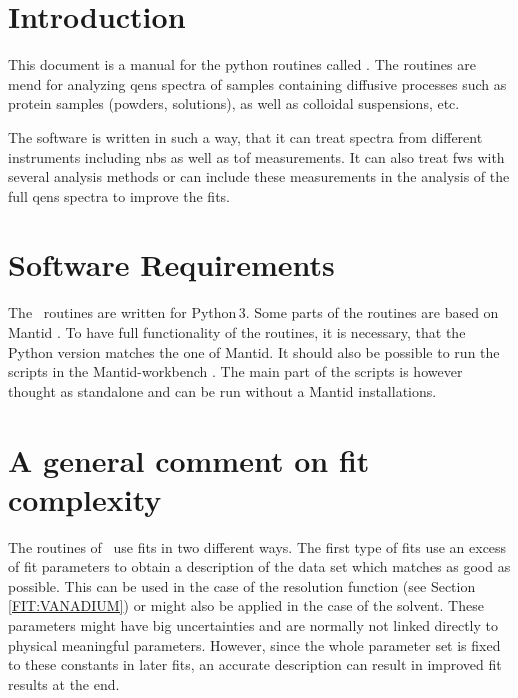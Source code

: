 \section{Introduction}
This document is a manual for the python routines called \PyQENS. The routines are mend for analyzing \gls{qens} spectra of samples containing diffusive processes such as protein samples (powders, solutions), as well as colloidal suspensions, etc.

The software is written in such a way, that it can treat spectra from different instruments including \gls{nbs} as well as \gls{tof} measurements. It can also treat \gls{fws} with several analysis methods or can include these measurements in the analysis of the full \gls{qens} spectra to improve the fits.

\section{Software Requirements}
\label{Software}
The \PyQENS\, routines are written for Python\,3. Some parts of the routines are based on Mantid \cite{Arnold2014}. To have full functionality of the routines, it is necessary, that the Python version matches the one of Mantid. It should also be possible to run the scripts in the Mantid-workbench . The main part of the scripts is however thought as standalone and can be run without a Mantid installations.
\section{A general comment on fit complexity}
\label{CommentFitparameters}
The routines of \PyQENS\, use fits in two different ways. The first type of fits use an excess of fit parameters to obtain a description of the data set which matches as good as possible. This can be used in the case of the resolution function (see Section \ref{FIT:VANADIUM}) \cite{Grimaldo_2015_JPhysChemLett} or might also be applied in the case of the solvent. These parameters might have big uncertainties and are normally not linked directly to physical meaningful parameters. However, since the whole parameter set is fixed to these constants in later fits, an accurate description can result in improved fit results at the end.

